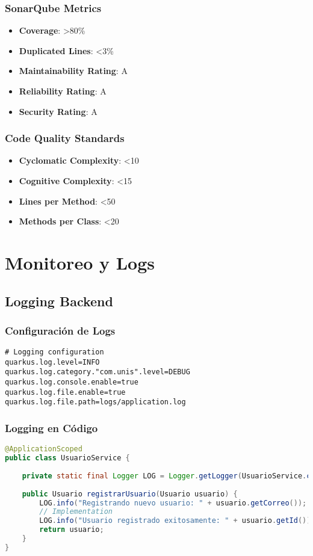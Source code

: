 \documentclass[12pt,a4paper]{article}
\begin{document}
\subsubsection{SonarQube Metrics}
\begin{itemize}
    \item \textbf{Coverage}: >80\%
    \item \textbf{Duplicated Lines}: <3\%
    \item \textbf{Maintainability Rating}: A
    \item \textbf{Reliability Rating}: A
    \item \textbf{Security Rating}: A
\end{itemize}

\subsubsection{Code Quality Standards}
\begin{itemize}
    \item \textbf{Cyclomatic Complexity}: <10
    \item \textbf{Cognitive Complexity}: <15
    \item \textbf{Lines per Method}: <50
    \item \textbf{Methods per Class}: <20
\end{itemize}

\section{Monitoreo y Logs}

\subsection{Logging Backend}

\subsubsection{Configuración de Logs}
\begin{lstlisting}[language=properties]
# Logging configuration
quarkus.log.level=INFO
quarkus.log.category."com.unis".level=DEBUG
quarkus.log.console.enable=true
quarkus.log.file.enable=true
quarkus.log.file.path=logs/application.log
\end{lstlisting}

\subsubsection{Logging en Código}
\begin{lstlisting}[language=java]
@ApplicationScoped
public class UsuarioService {
    
    private static final Logger LOG = Logger.getLogger(UsuarioService.class);
    
    public Usuario registrarUsuario(Usuario usuario) {
        LOG.info("Registrando nuevo usuario: " + usuario.getCorreo());
        // Implementation
        LOG.info("Usuario registrado exitosamente: " + usuario.getId());
        return usuario;
    }
}
\end{lstlisting}
\end{document}

